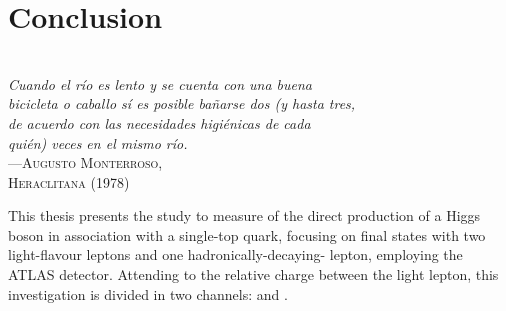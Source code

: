 \begin{comment}
%
%
asdf
\end{comment}

\chapter{Conclusion}

\label{chap:Conclusion}
\vspace*{0.1 cm} 
\hspace*{200pt} \\
\hspace*{0.25\textwidth} \textit{Cuando el río es lento y se cuenta con una buena } \\
\hspace*{0.25\textwidth} \textit{bicicleta o caballo sí es posible bañarse dos (y hasta tres, } \\
\hspace*{0.25\textwidth} \textit{de acuerdo con las necesidades higiénicas de cada } \\
\hspace*{0.25\textwidth} \textit{quién) veces en el mismo río.} \\
\hspace*{205pt} ---\textsc{Augusto Monterroso,} \\%
\hspace*{240 pt}     \textsc{Heraclitana (1978)} \\%
\vspace*{2cm} 


This thesis presents the study to measure of  the direct production of a Higgs boson in association
with a single-top quark, focusing on final states with two light-flavour leptons and one hadronically-decaying-\Ptau 
lepton, employing the ATLAS detector. Attending to the relative charge between the light lepton, 
this investigation is divided in two channels: \dilepOStau and \dilepSStau.

